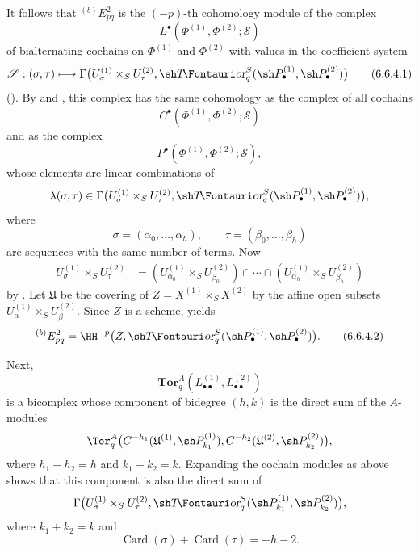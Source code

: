 \begin{env}[6.6.4]
It follows that ${}^{(b)}E_{pq}^2$ is the $(-p)$-th cohomology
module of the complex
\[
  L^\bullet(\Phi^{(1)},\Phi^{(2)};\mathcal S)
\]
of bialternating cochains on $\Phi^{(1)}$ and $\Phi^{(2)}$ with
values in the coefficient system
\[
  \mathcal S:(\sigma,\tau)\longmapsto
  \Gamma\bigl(
    U_\sigma^{(1)}\times_SU_\tau^{(2)},
    \shTor_q^S(\sh P_\bullet^{(1)},\sh P_\bullet^{(2)})
  \bigr)
  \tag{6.6.4.1}\label{III.6.6.4.1}
\]
().  By  and
, this complex has the same cohomology as the
complex of all cochains
\[
  C^\bullet(\Phi^{(1)},\Phi^{(2)};\mathcal S)
\]
and as the complex
\[
  P^\bullet(\Phi^{(1)},\Phi^{(2)};\mathcal S),
\]
whose elements are linear combinations of
\[
  \lambda(\sigma,\tau)\in
  \Gamma\bigl(
    U_\sigma^{(1)}\times_SU_\tau^{(2)},
    \shTor_q^S(\sh P_\bullet^{(1)},\sh P_\bullet^{(2)})
  \bigr),
\]
where
\[
  \sigma=(\alpha_0,\ldots,\alpha_h),
  \qquad
  \tau=(\beta_0,\ldots,\beta_h)
\]
are sequences with the same number of terms.  Now
\[
\begin{split}
  U_\sigma^{(1)}\times_SU_\tau^{(2)}
  &=
  (U_{\alpha_0}^{(1)}\times_SU_{\beta_0}^{(2)})
  \cap\cdots\cap
  (U_{\alpha_h}^{(1)}\times_SU_{\beta_h}^{(2)})
\end{split}
\]
by .  Let $\mathfrak U$ be the covering of
$Z=X^{(1)}\times_SX^{(2)}$ by the affine open subsets
$U_\alpha^{(1)}\times_SU_\beta^{(2)}$.  Since $Z$ is a scheme,
 yields
\[
  {}^{(b)}E_{pq}^2
  =
  \HH^{-p}
  \bigl(
    Z,\shTor_q^S
    (\sh P_\bullet^{(1)},\sh P_\bullet^{(2)})
  \bigr).
  \tag{6.6.4.2}\label{III.6.6.4.2}
\]

Next,
\[
  \mathbf{Tor}_q^A
  (L_{\bullet\bullet}^{(1)},L_{\bullet\bullet}^{(2)})
\]
is a bicomplex whose component of bidegree $(h,k)$ is the direct
sum of the $A$-modules
\[
  \Tor_q^A
  \bigl(
    C^{-h_1}(\mathfrak U^{(1)},\sh P_{k_1}^{(1)}),
    C^{-h_2}(\mathfrak U^{(2)},\sh P_{k_2}^{(2)})
  \bigr),
\]
where $h_1+h_2=h$ and $k_1+k_2=k$.  Expanding the cochain
modules as above shows that this component is also the direct
sum of
\[
  \Gamma\bigl(
    U_\sigma^{(1)}\times_SU_\tau^{(2)},
    \shTor_q^S(\sh P_{k_1}^{(1)},\sh P_{k_2}^{(2)})
  \bigr),
\]
where $k_1+k_2=k$ and
\[
  \operatorname{Card}(\sigma)
  +\operatorname{Card}(\tau)=-h-2.
\]


\end{env}
